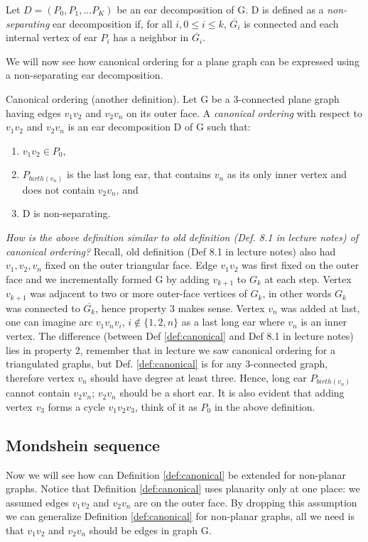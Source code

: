 \begin{defn}\label{def:nonseperating}
Let $D = (P_0, P_1,... P_K)$ be an ear decomposition of G.
D is defined as a \textit{non-separating} ear decomposition if, for all $i, 0 \leq i \leq k$, $\overline{G_i}$ is connected  
and each internal vertex of ear $P_i$ has a neighbor in $\overline{G_i}$.
\end{defn}

We will now see how canonical ordering for a plane graph can be expressed using a non-separating ear decomposition.

\begin{defn}\label{def:canonical}
Canonical ordering (another definition).
Let G be a 3-connected plane graph having edges $v_1v_2$ and $v_2v_n$ on its outer face.
A \textit{canonical ordering} with respect to $v_1v_2$ and $v_2v_n$ is an ear decomposition D of G such that:
\begin{enumerate}
\item $v_1v_2 \in P_0$,
\item $P_{birth(v_n)}$ is the last long ear, that contains $v_n$ as its only inner vertex and does not contain $v_2v_n$, and
\item D is non-separating.
\end{enumerate}
\end{defn}

\textit{How is the above definition similar to old definition (Def. 8.1 in lecture notes) of canonical ordering?}
Recall, old definition (Def 8.1 in lecture notes) also had $v_1,v_2,v_n$ fixed on the outer triangular face.
Edge $v_1v_2$ was first fixed on the outer face and we incrementally formed G by adding $v_{k+1}$ to $G_k$ at each step.
Vertex $v_{k+1}$ was adjacent to two or more outer-face vertices of $G_k$, in other words $G_k$ was connected to $\overline{G_k}$, hence property 3 makes sense.
Vertex $v_n$ was added at last, one can imagine arc $v_1v_nv_i$, $i \notin \{1,2,n\}$ as a last long ear where $v_n$ is an inner vertex.
The difference (between Def \ref {def:canonical} and Def 8.1 in lecture notes) lies in property 2, remember that in lecture we saw canonical ordering for a triangulated graphs, 
but Def. \ref{def:canonical} is for any 3-connected graph, therefore vertex $v_n$ should have degree at least three.
Hence, long ear $P_{birth(v_n)}$ cannot contain $v_2v_n$; $v_2v_n$ should be a short ear.
It is also evident that adding vertex $v_3$ forms a cycle $v_1v_2v_3$, think of it as $P_0$ in the above definition.


\subsection{Mondshein sequence}
Now we will see how can Definition \ref{def:canonical} be extended for non-planar graphs.
Notice that Definition \ref{def:canonical} uses planarity only at one place: we assumed edges $v_1v_2$ and $v_2v_n$ are on the outer face.
By dropping this assumption we can generalize Definition \ref{def:canonical} for non-planar graphs, all we need is that $v_1v_2$ and $v_2v_n$ should be edges in graph G.


